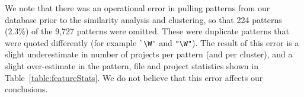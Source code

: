 We note that there was an operational error in pulling patterns from our database prior to the similarity analysis and clustering, so that 224 patterns (2.3\%) of the 9,727 patterns were omitted. These were duplicate patterns that were quoted differently (for example \verb!`\W'! and \verb!"\W"!).  The result of this error is a slight underestimate in number of projects per pattern (and per cluster), and a slight over-estimate in the pattern, file and project statistics shown in Table~\ref{table:featureStats}.  We do not believe that this error affects our conclusions.



